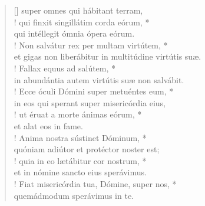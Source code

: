 \begin{verse}[\versewidth]
\vin super omnes qui hábitant terram,\\!
qui finxit singillátim corda eórum, *\\
qui intéllegit ómnia ópera eórum.\\!
\vin Non salvátur rex per multam virtútem, *\\
\vin et gigas non liberábitur in multitúdine virtútis suæ.\\!
Fallax equus ad salútem, *\\
in abundántia autem virtútis suæ non salvábit.\\!
\vin Ecce óculi Dómini super metuéntes eum, *\\
\vin in eos qui sperant super misericórdia eius,\\!
ut éruat a morte ánimas eórum, *\\
et alat eos in fame.\\!
\vin Anima nostra sústinet Dóminum, *\\
\vin quóniam adiútor et protéctor noster est;\\!
quia in eo lætábitur cor nostrum, *\\
et in nómine sancto eius sperávimus.\\!
\vin Fiat misericórdia tua, Dómine, super nos, *\\
\vin quemádmodum sperávimus in te.\\
\end{verse}
\vspace{1cm}


\def\greinitialformat#1{{\fontsize{40}{40}\selectfont #1}}
\gresetfirstlineaboveinitial{\small \textcolor{red}{ Ps. 61}}{}
\setaboveinitialseparation{0.72mm}


